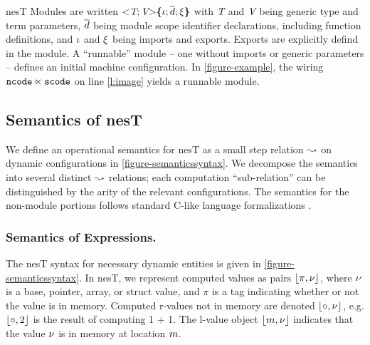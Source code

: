 nesT Modules are written $\margs{\tpdecl; \vpdecl}\lc \imports; \decls \exports \rc $ with
$\tpdecl$ and $\vpdecl$ being generic type and term parameters, $\vect{d}$ being module scope
identifier declarations, including function definitions, and $\imports$ and $\exports$ being
imports and exports. Exports are explicitly defind in the module. A ``runnable'' module -- one
without imports or generic parameters -- defines an initial machine configuration. In
\autoref{figure-example}, the wiring $\tt{ncode} \ltimes \tt{scode}$ on line \ref{l:image}
yields a runnable module.

\tasksemanticsfig


\subsection{Semantics of nesT} 
\label{section-nestsemantics}

We define an operational semantics for nesT as a small step relation $\compute$ on dynamic
configurations in \autoref{figure-semanticssyntax}. We decompose the semantics into several
distinct $\compute$ relations; each computation ``sub-relation'' can be distinguished by the
arity of the relevant configurations. The semantics for the non-module portions follows standard
C-like language formalizations \cite{Leroy-compcert-06,grossman03}.

\subsubsection{Semantics of Expressions.}

The nesT syntax for necessary dynamic entities is given in \autoref{figure-semanticssyntax}. In
nesT, we represent computed values as pairs $\cval{\pi}{\mv}$, where $\mv$ is a base, pointer,
array, or struct value, and $\pi$ is a tag indicating whether or not the value is in memory.
Computed r-values not in memory are denoted $\cval{\circ}{\mv}$, e.g. $\cval{\circ}{2}$ is the
result of computing 1 + 1. The l-value object $\cval{\bn}{\mv}$ indicates that the value $\mv$
is in memory at location $\bn$.

